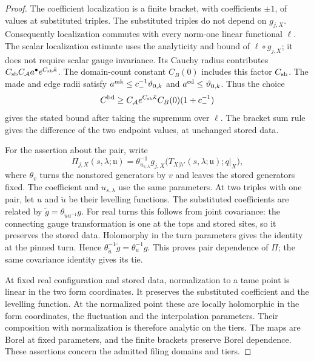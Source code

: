 \documentclass[11pt,letterpaper,reqno]{amsart}
\theoremstyle{definition}
\theoremstyle{remark}
\begin{document}
\begin{proof}
The coefficient localization is a finite bracket, with
coefficients $\pm1$, of values at substituted triples.
The substituted triples do not depend on $g_{j,X}$.
Consequently localization commutes with every norm-one
linear functional $\ell$. The scalar localization estimate
uses the analyticity and bound of $\ell\circ g_{j,X}$;
it does not require scalar gauge invariance. Its Cauchy
radius contributes
$C_{\rm sb}C_{\mathcal A}a^\bullet
e^{C_{\rm sb}\bar\kappa}$. The domain-count constant
$C_B(0)$ includes this factor $C_{\rm sb}$. The made and edge radii satisfy
$a^{\rm mk}\le c_-^{-1}\vartheta_{0,k}$ and
$a^{\rm ed}\le\vartheta_{0,k}$. Thus the choice
\[
 C^{\rm bd}\ge
 C_{\mathcal A}e^{C_{\rm sb}\bar\kappa}C_B(0)(1+c_-^{-1})
\]
gives the stated bound after taking the supremum over
$\ell$. The bracket sum rule gives the difference of the
two endpoint values, at unchanged stored data.

For the assertion about the pair, write
\[
 \Pi_{j,X}(s,\lambda;\mathfrak u)
 =\theta_{u_{s,\lambda}}^{-1}
  g_{j,X}\bigl(T_{X|h'}(s,\lambda;\mathfrak u);q|_X\bigr),
\]
where $\theta_v$ turns the nonstored generators by $v$ and
leaves the stored generators fixed. The coefficient and
$u_{s,\lambda}$ use the same parameters. At two triples
with one pair, let $u$ and $\widetilde u$ be their
levelling functions. The substituted coefficients are
related by $\widetilde g=\theta_{\widetilde u u^{-1}}g$.
For real turns this follows from joint covariance: the
connecting gauge transformation is one at the tops and
stored sites, so it preserves the stored data. Holomorphy
in the turn parameters gives the identity at the pinned
turn. Hence
$\theta_{\widetilde u}^{-1}\widetilde g
=\theta_u^{-1}g$. This proves pair dependence of $\Pi$;
the same covariance identity gives its tie.

At fixed real configuration and stored data, normalization
to a tame point is linear in the two form coordinates.
It preserves the substituted coefficient and the levelling
function. At the normalized point these are locally
holomorphic in the form coordinates, the fluctuation and
the interpolation parameters. Their composition with
normalization is therefore analytic on the tiers.
The maps are Borel at fixed parameters, and the finite
brackets preserve Borel dependence. These assertions
concern the admitted filing domains and tiers.
\end{proof}
\end{document}
